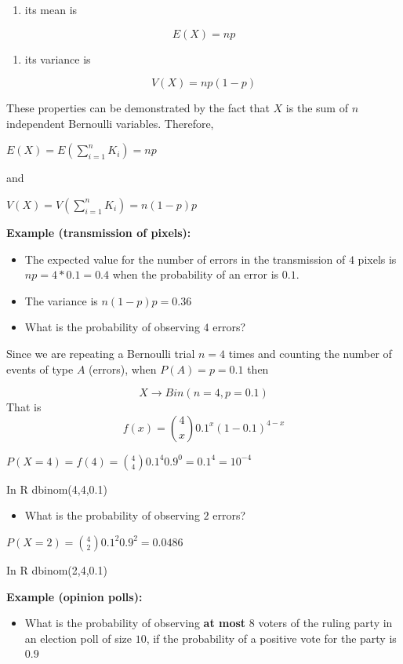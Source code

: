 \documentclass[
]{book}
\providecommand{\tightlist}{%
  \setlength{\itemsep}{0pt}\setlength{\parskip}{0pt}}
\begin{document}
\begin{enumerate}
\def\labelenumi{\arabic{enumi})}
\tightlist
\item
  its mean is
\end{enumerate}

\[E(X)=np\]

\begin{enumerate}
\def\labelenumi{\arabic{enumi})}
\setcounter{enumi}{1}
\tightlist
\item
  its variance is
\end{enumerate}

\[V(X)=np(1-p)\]

These properties can be demonstrated by the fact that \(X\) is the sum of \(n\) independent Bernoulli variables. Therefore,

\(E(X)=E(\sum_{i=1}^n K_i)=np\)

and

\(V(X)=V(\sum_{i=1}^n K_i)=n(1-p)p\)

\textbf{Example (transmission of pixels):}

\begin{itemize}
\item
  The expected value for the number of errors in the transmission of \(4\) pixels is \(np=4*0.1=0.4\) when the probability of an error is \(0.1\).
\item
  The variance is \(n(1-p)p=0.36\)
\item
  What is the probability of observing \(4\) errors?
\end{itemize}

Since we are repeating a Bernoulli trial \(n=4\) times and counting the number of events of type \(A\) (errors), when \(P(A)=p=0.1\) then

\[X \rightarrow Bin(n=4, p=0.1)\]
That is \[f(x)=\binom 4 x 0.1^x(1-0.1)^{4-x}\]

\(P(X=4)=f(4)=\binom 4 4 0.1^4 0.9^{0}=0.1^4=10^{-4}\)

In R dbinom(4,4,0.1)

\begin{itemize}
\tightlist
\item
  What is the probability of observing \(2\) errors?
\end{itemize}

\(P(X=2)=\binom 4 2 0.1^2 0.9^2=0.0486\)

In R dbinom(2,4,0.1)

\textbf{Example (opinion polls):}

\begin{itemize}
\tightlist
\item
  What is the probability of observing \textbf{at most} \(8\) voters of the ruling party in an election poll of size \(10\), if the probability of a positive vote for the party is \(0.9\)
\end{itemize}
\end{document}
